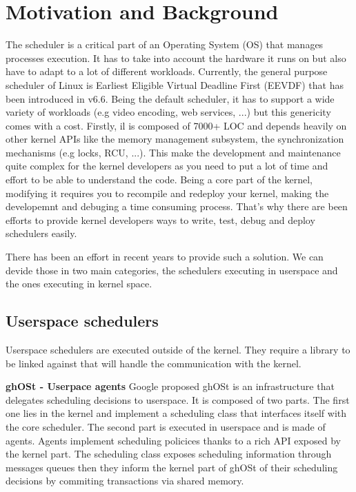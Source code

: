 \section{Motivation and Background}

\par The scheduler is a critical part of an Operating System (OS) that manages processes execution. It has to take into account the hardware it runs on but also have to adapt to a lot of different workloads. Currently, the general purpose scheduler of Linux is Earliest Eligible Virtual Deadline First (EEVDF) that has been introduced in v6.6. Being the default scheduler, it has to support a wide variety of workloads (e.g video encoding, web services,  ...) but this genericity comes with a cost. Firstly, il is composed of 7000+ LOC and depends heavily on other kernel APIs like the memory management subsystem, the synchronization mechanisms (e.g locks, RCU, ...). This make the development and maintenance quite complex for the kernel developers as you need to put a lot of time and effort to be able to understand the code. Being a core part of the kernel, modifying it requires you to recompile and redeploy your kernel, making the developemnt and debuging a time consuming process. That's why there are been efforts to provide kernel developers ways to write, test, debug and deploy schedulers easily. \\ \newline


\par There has been an effort in recent years to provide such a solution. We can devide those in two main categories, the schedulers executing in userspace and the ones executing in kernel space. \\

\subsection{Userspace schedulers}
\par Userspace schedulers are executed outside of the kernel. They require a library to be linked against that will handle the communication with the kernel. \\

\par \textbf{ghOSt - Userpace agents} Google proposed ghOSt\cite{ghost} is an infrastructure that delegates scheduling decisions to userspace. It is composed of two parts. The first one lies in the kernel and implement a scheduling class that interfaces itself with the core scheduler. The second part is executed in userspace and is made of agents. Agents implement scheduling policices thanks to a rich API exposed by the kernel part. The scheduling class exposes scheduling information through messages queues then they inform the kernel part of ghOSt of their scheduling decisions by commiting transactions via shared memory.\newline

